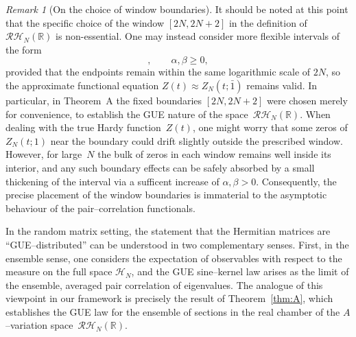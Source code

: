\documentclass[12pt,reqno]{amsart}
\theoremstyle{plain}
\theoremstyle{definition}
\theoremstyle{remark}
\newtheorem{rem}{Remark}[section]       %
\begin{document}
\begin{rem}[On the choice of window boundaries]
\label{rem:window-flexibility}
It should be noted at this point that the specific choice of the window $[2N,2N+2]$ in the definition of $\mathcal{RH}_N(\mathbb{R})$ is non-essential. One may instead consider more
flexible intervals of the form
\begin{equation} 
[\,2N-\alpha,\,2N+2+\beta\,],
\qquad
\alpha,\beta \geq 0,
\end{equation} 
provided that the endpoints remain within the same logarithmic scale of
$2N$, so the approximate functional equation $Z(t) \approx Z_N(t; \bar 1)$ remains valid. In particular, in Theorem~A the fixed boundaries $[2N,2N+2]$ were chosen merely for
convenience, to establish the GUE nature of the
space~$\mathcal{RH}_N(\mathbb R)$.
When dealing with the true Hardy function~$Z(t)$, one might worry that some
zeros of $Z_N(t;1)$ near the boundary could drift slightly outside the
prescribed window.
However, for large~$N$ the bulk of zeros in each window remains well inside
its interior, and any such boundary effects can be safely absorbed by a small
thickening of the interval via a sufficent increase of $\alpha, \beta>0$.
Consequently, the precise placement of the window boundaries is immaterial to
the asymptotic behaviour of the pair–correlation functionals.
\end{rem}


In the random matrix setting, the statement that the Hermitian matrices are 
``GUE--distributed'' can be understood in two complementary senses.  
First, in the ensemble sense, one considers the expectation of observables 
with respect to the measure on the full space $\mathcal{H}_N$, and the 
GUE sine--kernel law arises as the limit of the ensemble, averaged 
pair correlation of eigenvalues.  
The analogue of this viewpoint in our framework is precisely the result of 
Theorem~\ref{thm:A}, which establishes the GUE law for the ensemble of sections 
in the real chamber of the $A$--variation space~$\mathcal{RH}_N(\mathbb{R})$.
\end{document}
